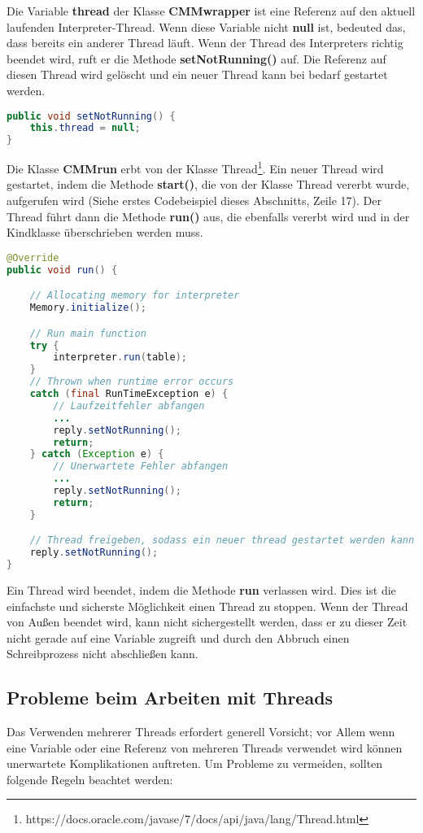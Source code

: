 Die Variable \textbf{thread} der Klasse \textbf{CMMwrapper} ist eine Referenz auf den aktuell laufenden Interpreter-Thread. Wenn diese Variable nicht \textbf{null} ist, bedeuted das, dass bereits ein anderer Thread läuft. Wenn der Thread des Interpreters richtig beendet wird, ruft er die Methode \textbf{setNotRunning()} auf. Die Referenz auf diesen Thread wird gelöscht und ein neuer Thread kann bei bedarf gestartet werden.
\begin{lstlisting}[language=JAVA]
public void setNotRunning() {
	this.thread = null;
}
\end{lstlisting}

Die Klasse \textbf{CMMrun} erbt von der Klasse Thread\footnote{https://docs.oracle.com/javase/7/docs/api/java/lang/Thread.html}. Ein neuer Thread wird gestartet, indem die Methode \textbf{start()}, die von der Klasse Thread vererbt wurde, aufgerufen wird (Siehe erstes Codebeispiel dieses Abschnitts, Zeile 17). Der Thread führt dann die Methode \textbf{run()} aus, die ebenfalls vererbt wird und in der Kindklasse überschrieben werden muss.
\begin{lstlisting}[language=JAVA]
@Override
public void run() {

	// Allocating memory for interpreter
	Memory.initialize();

	// Run main function
	try {
		interpreter.run(table);
	}
	// Thrown when runtime error occurs
	catch (final RunTimeException e) {
		// Laufzeitfehler abfangen
		... 
		reply.setNotRunning();
		return;
	} catch (Exception e) {
		// Unerwartete Fehler abfangen
		...
		reply.setNotRunning();
		return;
	}

	// Thread freigeben, sodass ein neuer thread gestartet werden kann
	reply.setNotRunning();
}
\end{lstlisting}

Ein Thread wird beendet, indem die Methode \textbf{run} verlassen wird. Dies ist die einfachste und sicherste Möglichkeit einen Thread zu stoppen. Wenn der Thread von Außen beendet wird, kann nicht sichergestellt werden, dass er zu dieser Zeit nicht gerade auf eine Variable zugreift und durch den Abbruch einen Schreibprozess nicht abschließen kann.

\subsection{Probleme beim Arbeiten mit Threads}
Das Verwenden mehrerer Threads erfordert generell Vorsicht; vor Allem wenn eine Variable oder eine Referenz von mehreren Threads verwendet wird können unerwartete Komplikationen auftreten. Um Probleme zu vermeiden, sollten folgende Regeln beachtet werden:

